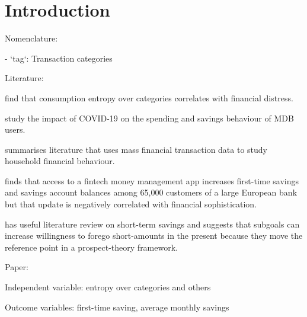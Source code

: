 
\section{Introduction}%
\label{sec:introduction}

Nomenclature:

- `tag`: Transaction categories


Literature:

\citet{muggleton2020evidence} find that consumption entropy over categories
correlates with financial distress.

\citet{davenport2020spending} study the impact of COVID-19 on the spending and
savings behaviour of MDB users.

\citet{baker2021household} summarises literature that uses mass financial
transaction data to study household financial behaviour.

\citet{becker2017does} finds that access to a fintech money management app
increases first-time savings and savings account balances among 65,000 customers
of a large European bank but that update is negatively correlated with financial
sophistication.

\citet{colby2013savings} has useful literature review on short-term savings and
suggests that subgoals can increase willingness to forego short-amounts in the
present because they move the reference point in a prospect-theory framework.

Paper:

Independent variable: entropy over categories and others

Outcome variables: first-time saving, average monthly savings
